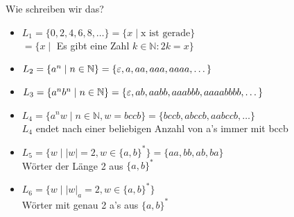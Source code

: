\begin{frame}[fragile]{Wie schreiben wir das?}
    \begin{itemize}[<+- | alert@+>]
        \item $L_1 = \{0,2,4,6,8,\dots\} = \{x \mid \text{x ist gerade}\}$\\
        \hspace{4.5mm}$= \{x \mid$ Es gibt eine Zahl $k \in \mathbb{N} : 2k = x\}$\\
        
        \item $L_2 = \{a^n \mid n \in \mathbb{N}\} = \{\varepsilon, a,aa,aaa,aaaa, \dots\}$
        
        \item $L_3 = \{a^nb^n \mid n \in \mathbb{N}\} = \{\varepsilon, ab ,aabb,aaabbb,aaaabbbb, \dots\}$
        
        \item $L_4 = \{a^nw \mid n \in \mathbb{N}, w = bccb\} = \{bccb, abccb, aabccb, \dots\}$\\
        $L_4$ endet nach einer beliebigen Anzahl von a's immer mit bccb
        
        \item $L_5 = \{w \mid |w| = 2, w\in \{a,b\}^{*}\} = \{aa,bb,ab,ba\}$\\
        Wörter der Länge 2 aus $\{a,b\}^{*}$
        
        \item $L_6 = \{w \mid |w|_a = 2, w\in \{a,b\}^{*}\}$\\
        Wörter mit \alert{genau} 2 a's aus $\{a,b\}^{*}$
    \end{itemize}
\end{frame}

